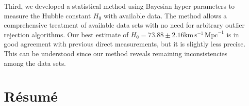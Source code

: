 \documentclass[12pt]{report}
\newcommand{\km}{\mathrm{km}}
\newcommand{\second}{\mathrm{s}}
\newcommand{\Mpc}{\mathrm{Mpc}}
\renewcommand{\(}{\left(}
\renewcommand{\)}{\right)}
\renewcommand{\[}{\left[}
\renewcommand{\]}{\right]}
\begin{document}
Third, we developed a statistical method using Bayesian hyper-parameters to measure the Hubble constant $H_0$ with available data. The method allows a comprehensive treatment of available data sets with no need for arbitrary outlier rejection algorithms. Our best estimate of $H_0 = 73.88 \pm 2.16 \km\, \second^{-1}\, \Mpc^{-1}$ is in good agreement with previous direct measurements, but it is slightly less precise. This can be understood since our method reveals remaining inconsistencies among the data sets. 

\newpage

\chapter*{R\'{e}sum\'{e}}  

\vspace{3mm}
\end{document}
